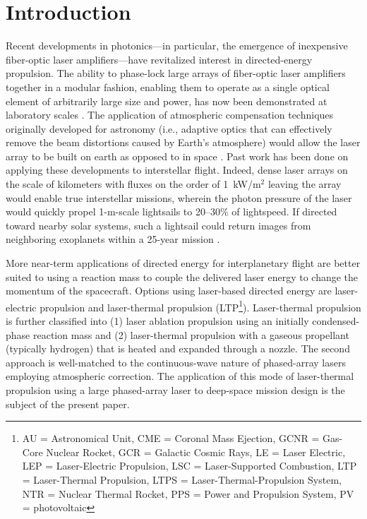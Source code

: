 \documentclass[final,3p,times,twocolumn,sort&compress, lefttitle]{elsarticle}
\begin{document}
    \section{Introduction}
        Recent developments in photonics—in particular, the emergence of inexpensive fiber-optic laser amplifiers—have revitalized interest in directed-energy propulsion. The ability to phase-lock large arrays of fiber-optic laser amplifiers together in a modular fashion, enabling them to operate as a single optical element of arbitrarily large size and power, has now been demonstrated at laboratory scales \cite{srinivasan_directed_2019-1,srinivasan_directed_2019}. The application of atmospheric compensation techniques originally developed for astronomy (i.e., adaptive optics that can effectively remove the beam distortions caused by Earth’s atmosphere) would allow the laser array to be built on earth as opposed to in space \cite{bandutunga_photonic_2021,hettel_beam_2021}. Past work has been done on applying these developments to interstellar flight. Indeed, dense laser arrays on the scale of kilometers with fluxes on the order of 1~kW/m$^2$ leaving the array would enable true interstellar missions, wherein the photon pressure of the laser would quickly propel 1-m-scale lightsails to 20--30\% of lightspeed. If directed toward nearby solar systems, such a lightsail could return images from neighboring exoplanets within a 25-year mission \cite{ lubin_roadmap_2016,parkin_breakthrough_2018}.
        
        More near-term applications of directed energy for interplanetary flight are better suited to using a reaction mass to couple the delivered laser energy to change the momentum of the spacecraft. Options using laser-based directed energy are laser-electric propulsion \cite{brophy_directed-energy_2019,sheerin_fast_2021} and laser-thermal propulsion (LTP\footnote{AU = Astronomical Unit, CME = Coronal Mass Ejection, GCNR = Gas-Core Nuclear Rocket, GCR = Galactic Cosmic Rays, LE = Laser Electric, LEP = Laser-Electric Propulsion, LSC = Laser-Supported Combustion, LTP = Laser-Thermal Propulsion, LTPS = Laser-Thermal-Propulsion System, NTR = Nuclear Thermal Rocket, PPS = Power and Propulsion System, PV = photovoltaic}). Laser-thermal propulsion is further classified into (1) laser ablation propulsion using an initially condensed-phase reaction mass \cite{phipps_review_2010} and (2) laser-thermal propulsion with a gaseous propellant (typically hydrogen) that is heated and expanded through a nozzle. The second approach is well-matched to the continuous-wave nature of phased-array lasers employing atmospheric correction. The application of this mode of laser-thermal propulsion using a large phased-array laser to deep-space mission design is the subject of the present paper.
        
\end{document}

